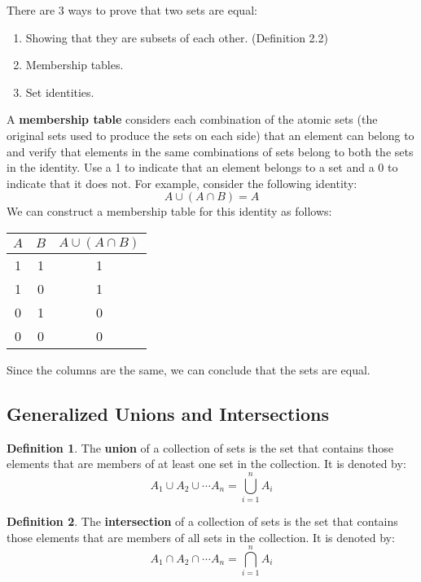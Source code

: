 \documentclass[article, 12pt]{article}
\theoremstyle{definition}
\newtheorem{definition}{Definition}[subsection]
\newcommand{\unite}{\cup}
\newcommand{\inter}{\cap}
\begin{document}
    There are 3 ways to prove that two sets are equal:
    \begin{enumerate}
        \item Showing that they are subsets of each other. (Definition 2.2)
        \item Membership tables.
        \item Set identities.
    \end{enumerate}
    A \textbf{membership table} considers each combination of the atomic sets (the original sets used to produce the sets on each side) that an element can belong to and verify that elements in the same combinations of sets belong to both the sets in the identity. Use a 1 to indicate that an element belongs to a set and a 0 to indicate that it does not. For example, consider the following identity:
    \begin{equation*}
        A \unite (A \inter B) = A
    \end{equation*}
    We can construct a membership table for this identity as follows:
    \begin{center}
        \begin{tabular}{|c|c|c|}
            \hline
            $A$ & $B$ & $A \unite (A \inter B)$ \\
            \hline
            1 & 1 & 1 \\
            1 & 0 & 1 \\
            0 & 1 & 0 \\
            0 & 0 & 0 \\
            \hline
        \end{tabular}
    \end{center}
    Since the columns are the same, we can conclude that the sets are equal.
    \subsection{Generalized Unions and Intersections}
    \begin{definition}
        The \textbf{union} of a collection of sets is the set that contains those elements that are members of at least one set in the collection. It is denoted by:
        \begin{equation*}
            A_1 \unite A_2 \unite \cdots A_n = \bigcup_{i=1}^{n} A_i
        \end{equation*}
    \end{definition}
    \begin{definition}
        The \textbf{intersection} of a collection of sets is the set that contains those elements that are members of all sets in the collection. It is denoted by:
        \begin{equation*}
            A_1 \inter A_2 \inter \cdots A_n = \bigcap_{i=1}^{n} A_i
        \end{equation*}
    \end{definition}
\end{document}
